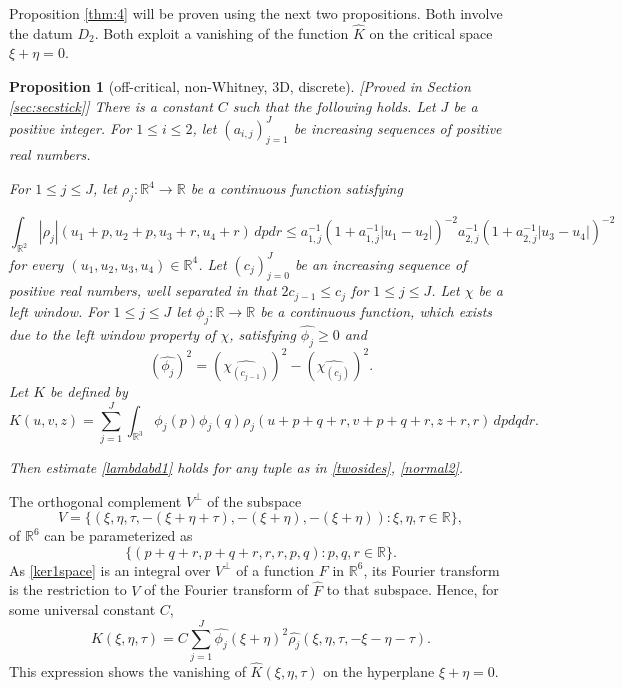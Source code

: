 \documentclass[12pt,reqno]{amsart}
\theoremstyle{plain}
\newtheorem{prop}[theorem]{Proposition}
\theoremstyle{definition}
\numberwithin{equation}{section}
\newcommand{\R}{{\mathbb R}}
\def\wh{\widehat}
\begin{document}
 




Proposition \ref{thm:4} will be proven using the next two propositions.
Both involve the datum $D_2$. Both exploit
a vanishing of the function $\widehat{K}$
on the critical space $\xi+\eta=0$.

 
\begin{prop}[off-critical, non-Whitney, 3D, discrete][Proved in Section \ref{sec:secstick}]
\label{secstickphi} 
 There is a constant $C$ such that the following holds. Let $J$ be a positive integer. 
For $1\le i\le 2$,  let  $(a_{i,j})_{j=1}^{J}$  be increasing sequences of positive real numbers. 


For $1\leq j \leq J$,  let $\rho_{j}:\R^4\to \R$ be a continuous function satisfying 

\begin{equation}\label{rhobound}
\int_{\R^2} |\rho_{j} | (u_1+p,u_2+p,u_3+r,u_4+r)\, dp dr
 \le a_{1,j}^{-1}(1+a_{1,j}^{-1}|u_1-u_2|)^{-2}
 a_{2,j}^{-1}(1+a_{2,j}^{-1}|u_3-u_4|)^{-2}
\end{equation}
for every $(u_1,u_2,u_3,u_4)\in \R^4$.
Let $(c_j)_{j=0}^J$ be an increasing sequence of positive {real} numbers,
well separated in that $2c_{j-1}\le c_j$ for $1\le j\le J$.
 Let $\chi$ be a left window.
For $1\le j\le J$ let $\phi_{j}:\R\to \R$ be   a continuous function, which exists due
 to the left window property of $\chi$, satisfying  $\wh{\phi_j} \geq 0$  and 
 \[(\wh{\phi_{j}})^2 = (\wh{{\chi}_{(c_{j-1})}})^2 
 - (\wh{{\chi}_{(c_j)}})^2. \]
 Let $K$ be defined by   
      \begin{equation}
        \label{ker1space}
    {K}(u,v,z)= \sum_{j=1}^J \int_{\R^3}{\phi_{j}}(p)
    {\phi_{j}}(q) {\rho_{j}}(u+p+q+r,v+p+q+r,z+r,r) \,dpdqdr. 
    \end{equation}

      Then estimate \eqref{lambdabd1} holds for any tuple as in \eqref{twosides}, \eqref{normal2}.
 \end{prop}

The orthogonal complement $V^\perp$ of the subspace \[V=\{(\xi,\eta,\tau, -(\xi+\eta+\tau), -(\xi+\eta), -(\xi+\eta)): \xi,\eta,  \tau \in \R\},\] 
 of $\R^6$ can be parameterized as  
\[\{(p+q+r,p+q+r,r,r,p,q): p,q,r\in \R\}.\]
As \eqref{ker1space} is an integral over $V^\perp$ of a function $F$ in $\R^6$,
its Fourier transform is the restriction to $V$ of the Fourier transform
of $\widehat{F}$ to that subspace. Hence, for some universal constant $C$,
     \begin{equation}
        \label{ker1}
    \widehat{K}(\xi,\eta,\tau)= C\sum_{j=1}^J \widehat{\phi_{j}}(\xi+\eta)^2 \widehat{\rho_{j}}(\xi,\eta,\tau,-\xi-\eta-\tau). 
    \end{equation}
 This expression shows the vanishing of $\widehat{K}(\xi,\eta,\tau)$
on the hyperplane $\xi+\eta=0$.
\end{document}
